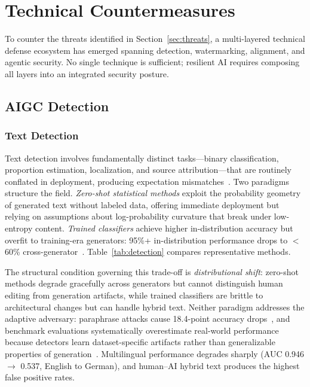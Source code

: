 
\section{Technical Countermeasures}
\label{sec:countermeasures}

To counter the threats identified in Section~\ref{sec:threats}, a multi-layered technical defense ecosystem has emerged spanning detection, watermarking, alignment, and agentic security. No single technique is sufficient; resilient AI requires composing all layers into an integrated security posture.


\subsection{AIGC Detection}
\label{sec:detect}

\subsubsection{Text Detection}
\label{sec:detect-text}

Text detection involves fundamentally distinct tasks---binary classification, proportion estimation, localization, and source attribution---that are routinely conflated in deployment, producing expectation mismatches~\cite{dugan2024raid}. Two paradigms structure the field. \emph{Zero-shot statistical methods} exploit the probability geometry of generated text without labeled data, offering immediate deployment but relying on assumptions about log-probability curvature that break under low-entropy content. \emph{Trained classifiers} achieve higher in-distribution accuracy but overfit to training-era generators: 95\%+ in-distribution performance drops to $<$60\% cross-generator~\cite{macko2023multitude}. Table~\ref{tab:detection} compares representative methods.

The structural condition governing this trade-off is \emph{distributional shift}: zero-shot methods degrade gracefully across generators but cannot distinguish human editing from generation artifacts, while trained classifiers are brittle to architectural changes but can handle hybrid text. Neither paradigm addresses the adaptive adversary: paraphrase attacks cause 18.4-point accuracy drops~\cite{dugan2024raid}, and benchmark evaluations systematically overestimate real-world performance because detectors learn dataset-specific artifacts rather than generalizable properties of generation~\cite{macko2023multitude}. Multilingual performance degrades sharply (AUC 0.946 $\to$ 0.537, English to German), and human--AI hybrid text produces the highest false positive rates.

